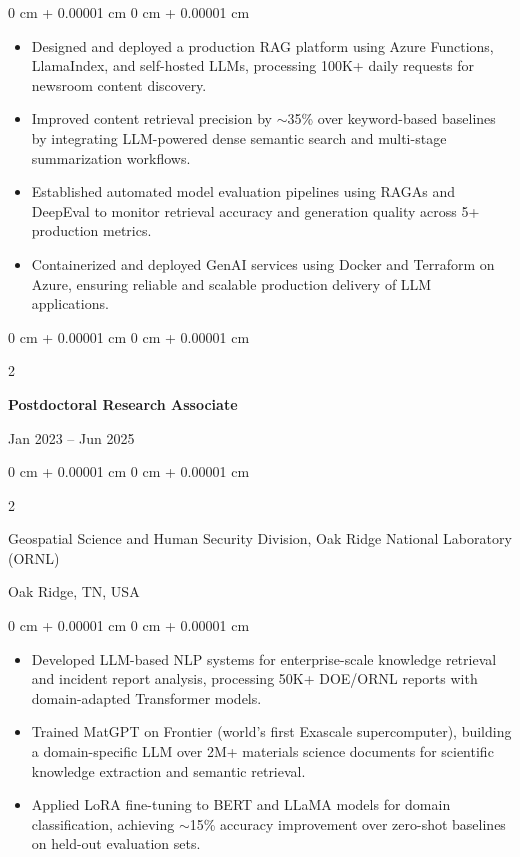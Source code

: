 \documentclass[10pt, letterpaper]{article}
\newenvironment{highlights}{
    \begin{itemize}[
        topsep=0.10 cm,
        parsep=0.10 cm,
        partopsep=0pt,
        itemsep=0pt,
        leftmargin=0 cm + 10pt
    ]
}{
    \end{itemize}
} %
\newenvironment{onecolentry}{
    \begin{adjustwidth}{
        0 cm + 0.00001 cm
    }{
        0 cm + 0.00001 cm
    }
}{
    \end{adjustwidth}
} %
\newenvironment{twocolentry}[2][]{
    \onecolentry
    \def\secondColumn{#2}
    \setcolumnwidth{\fill, 4.5 cm}
    \begin{paracol}{2}
}{
    \switchcolumn \raggedleft \secondColumn
    \end{paracol}
    \endonecolentry
} %
\begin{document}
    \begin{onecolentry}
        \begin{highlights}
            \item Designed and deployed a production RAG platform using Azure Functions, LlamaIndex, and self-hosted LLMs, processing 100K+ daily requests for newsroom content discovery.
            \item Improved content retrieval precision by $\sim$35\% over keyword-based baselines by integrating LLM-powered dense semantic search and multi-stage summarization workflows.
            \item Established automated model evaluation pipelines using RAGAs and DeepEval to monitor retrieval accuracy and generation quality across 5+ production metrics.
            \item Containerized and deployed GenAI services using Docker and Terraform on Azure, ensuring reliable and scalable production delivery of LLM applications.
        \end{highlights}
    \end{onecolentry}

    \vspace{1mm}

    \begin{twocolentry}{Jan 2023 -- Jun 2025}
        \textbf{Postdoctoral Research Associate}
    \end{twocolentry}
    \begin{twocolentry}{Oak Ridge, TN, USA}
        Geospatial Science and Human Security Division, Oak Ridge National Laboratory (ORNL)
    \end{twocolentry}
    \vspace{0.10 cm}
    \begin{onecolentry}
        \begin{highlights}
            \item Developed LLM-based NLP systems for enterprise-scale knowledge retrieval and incident report analysis, processing 50K+ DOE/ORNL reports with domain-adapted Transformer models.
            \item Trained MatGPT on Frontier (world's first Exascale supercomputer), building a domain-specific LLM over 2M+ materials science documents for scientific knowledge extraction and semantic retrieval.
            \item Applied LoRA fine-tuning to BERT and LLaMA models for domain classification, achieving $\sim$15\% accuracy improvement over zero-shot baselines on held-out evaluation sets.
        \end{highlights}
    \end{onecolentry}
\end{document}
